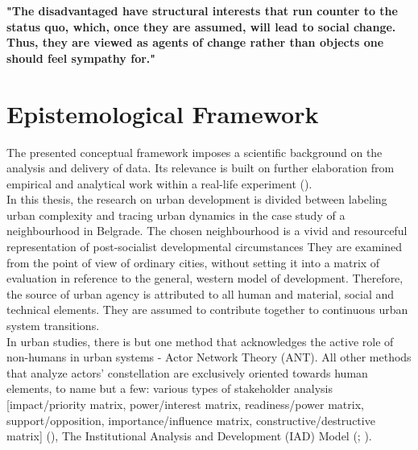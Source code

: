 \documentclass[11pt]{report}
\begin{document}
{{{{\textbf{"The disadvantaged have structural interests that run counter to the status quo, which, once they are assumed, will lead to social change. Thus, they are viewed as agents of change rather than objects one should feel sympathy for." \citealt{Sears 2008}}

\section{Epistemological Framework}
The presented conceptual framework imposes a scientific background on the analysis and delivery of data.
Its relevance is built on further elaboration from empirical and analytical work within a real-life experiment (\href{Parnell}{\citealt{parnell_retheorizing_2012}}).
\\

In this thesis, the research on urban development is divided between labeling urban complexity and tracing urban dynamics in the case study of a neighbourhood in Belgrade.
The chosen neighbourhood is a vivid and resourceful representation of post-socialist developmental circumstances
They are examined from the point of view of ordinary cities, without setting it into a matrix of evaluation in reference to the general, western model of development.
Therefore, the source of urban agency is attributed to 
all human and material, social and technical elements. They are assumed to contribute together to continuous urban system transitions.
\\

In urban studies, there is but one method that acknowledges the active role of non-humans in urban systems - Actor Network Theory (ANT).
All other methods that analyze actors' constellation are exclusively oriented towards human elements, to name but a few: various types of stakeholder analysis [impact/priority matrix, power/interest matrix, readiness/power matrix, support/opposition, importance/influence matrix,
constructive/destructive matrix] (\href{Mathur}{\citealt{mathur_defining_2007}}), The Institutional Analysis and Development (IAD) Model (\href{Ostrom}{\citealt{ostrom_governing_1995}}; \href{Ostrom}{\citealt{ostrom_upravljanje_2006}}).
\\

}}}}
\end{document}

